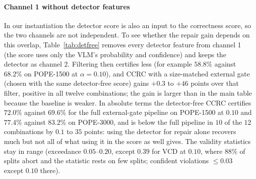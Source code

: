 \paragraph{Channel 1 without detector features}
In our instantiation the detector score is also an input to the correctness score, so the two channels are not independent. To see whether the repair
gain depends on this overlap, Table~\ref{tab:detfree} removes every detector feature from channel 1 (the score uses only the VLM's probability and confidence)
and keeps the detector as channel 2. Filtering then certifies less (for example $58.8\%$ against $68.2\%$ on POPE-1500 at $\alpha=0.10$), and CCRC with
a size-matched external gate (chosen with the same detector-free score) gains $+0.3$ to $+46$ points over that filter, positive in all twelve combinations;
the gain is larger than in the main table because the baseline is weaker. In absolute terms the detector-free CCRC certifies $72.0\%$ against $69.6\%$ for the
full external-gate pipeline on POPE-1500 at $0.10$ and $77.4\%$ against $83.2\%$ on POPE-3000, and is below the full pipeline in $10$ of the $12$
combinations by $0.1$ to $35$ points: using the detector for repair alone recovers much but not all of what using it in the score as well gives. The
validity statistics stay in range (exceedance $0.05$--$0.20$, except $0.39$ for VCD at $0.10$, where $88\%$ of splits abort and the statistic rests on few
splits; confident violations $\le0.03$ except $0.10$ there).

\begin{table}[t]
\centering
\caption{Certified coverage (\%, abort rate in parentheses) with channel 1 restricted to the VLM's own signals and with the full score. CCRC uses the
size-matched external gate in both cases (selected with the matching score); gain is against filtering with the same score.}
\label{tab:detfree}
\small
\resizebox{\textwidth}{!}{}
\end{table}

